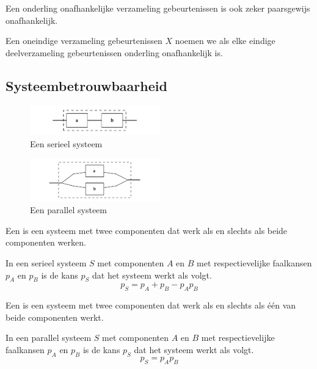 \documentclass[main.tex]{subfiles}
\begin{document}
\begin{ei}
  Een onderling onafhankelijke verzameling gebeurtenissen is ook zeker paarsgewijs onafhankelijk.
\end{ei}

\begin{de}
  Een oneindige verzameling gebeurtenissen $X$ noemen we  als elke eindige deelverzameling gebeurtenissen onderling onafhankelijk is.
\end{de}

\subsection{Systeembetrouwbaarheid}
\label{sec:syst}

\begin{figure}[H]
  \caption{Een serieel systeem}
  \centering
    \includegraphics[width=0.5\textwidth]{assets/systeem-serieel.png}
\end{figure}

\begin{figure}[H]
  \caption{Een parallel systeem}
  \centering
    \includegraphics[width=0.5\textwidth]{assets/systeem-parallel.png}
\end{figure}

\begin{de}
  Een  is een systeem met twee componenten dat werk als en slechts als beide componenten werken.
\end{de}

\begin{st}
  In een serieel systeem $S$ met componenten $A$ en $B$ met respectievelijke faalkansen $p_{A}$ en $p_{B}$ is de kans $p_{S}$ dat het systeem werkt als volgt.
  \[ p_{S} = p_{A} + p_{B} -p_{A}p_{B} \]
\end{st}

\begin{de}
  Een  is een systeem met twee componenten dat werk als en slechts als \'e\'en van beide componenten werkt.
\end{de}

\begin{st}
  In een parallel systeem $S$ met componenten $A$ en $B$ met respectievelijke faalkansen $p_{A}$ en $p_{B}$ is de kans $p_{S}$ dat het systeem werkt als volgt.
  \[ p_{S} = p_{A}p_{B} \]
\end{st}
\end{document}
